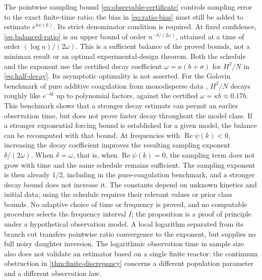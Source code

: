 The pointwise sampling bound \eqref{eq:observable-certificate} controls
sampling error to the exact finite-time ratio; the bias in
\eqref{eq:ratio-bias} must still be added to estimate $e^{h\psi(k)}$.
Its strict denominator condition is required. At fixed confidence,
\eqref{eq:balanced-ratio} is an upper bound of order
$n^{-\delta/(2\omega)}$, attained at a time of order
$(\log n)/(2\omega)$. This is a sufficient balance of the proved bounds,
not a minimax result or an optimal experimental-design theorem.
Both the schedule and the exponent use the certified decay coefficient
$\omega=\kappa(b+\sigma)$ for $H^2/N$ in \eqref{eq:half-decay}.
Its asymptotic optimality is not asserted. For the Golovin
benchmark of pure additive coagulation from monodisperse data
\citep{Golovin1963}, $H^2/N$ decays roughly like $e^{-bt}$ up to
polynomial factors, against the certified $\omega=\kappa b\approx0.17b$.
This benchmark shows that a stronger decay estimate can permit an earlier
observation time, but does not prove faster decay throughout the model
class. If a stronger exponential forcing bound is established for a given
model, the balance can be recomputed with that bound. At frequencies with
$\operatorname{Re}\psi(k)<0$, increasing the decay coefficient improves
the resulting sampling exponent $\delta/(2\omega)$.
When $\delta=\omega$, that is, when $\operatorname{Re}\psi(k)=0$, the
sampling term does not grow with time and the same schedule remains
sufficient. The sampling exponent is then already $1/2$, including in the
pure-coagulation benchmark, and a stronger decay bound does not increase
it. The constants depend on unknown kinetics
and initial data; using the schedule requires their relevant values or
prior class bounds. No adaptive choice of time or frequency is proved,
and no computable procedure selects the frequency interval $I$; the
proposition is a proof of principle under a hypothetical observation
model.
A local logarithm separated from its branch cut transfers pointwise ratio
convergence to the exponent, but supplies no full noisy daughter inversion.
The logarithmic observation time in sample size also does not validate
an estimator based on a single finite reactor: the continuum obstruction
in \cref{thm:finite-discrepancy} concerns a different population parameter
and a different observation law.

